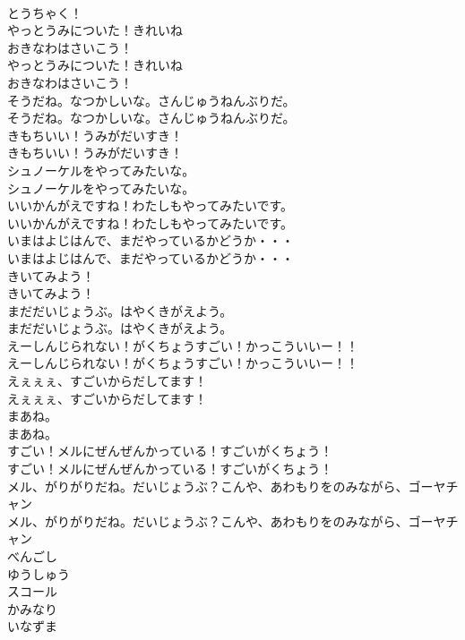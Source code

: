 \documentclass[8pt]{extreport}
\begin{document}
\begin{CJK}{UTF8}{min}
\\	とうちゃく！ 
\\	やっとうみについた！きれいね
\\	おきなわはさいこう！	
\\	やっとうみについた！きれいね
\\	おきなわはさいこう！ 
\\	そうだね。なつかしいな。さんじゅうねんぶりだ。	
\\	そうだね。なつかしいな。さんじゅうねんぶりだ。 
\\	きもちいい！うみがだいすき！	
\\	きもちいい！うみがだいすき！ 
\\	シュノーケルをやってみたいな。	
\\	シュノーケルをやってみたいな。 
\\	いいかんがえですね！わたしもやってみたいです。	
\\	いいかんがえですね！わたしもやってみたいです。 
\\	いまはよじはんで、まだやっているかどうか・・・	
\\	いまはよじはんで、まだやっているかどうか・・・ 
\\	きいてみよう！	
\\	きいてみよう！ 
\\	まだだいじょうぶ。はやくきがえよう。	
\\	まだだいじょうぶ。はやくきがえよう。 
\\	えーしんじられない！がくちょうすごい！かっこういいー！！	
\\	えーしんじられない！がくちょうすごい！かっこういいー！！ 
\\	えぇぇぇ、すごいからだしてます！	
\\	えぇぇぇ、すごいからだしてます！ 
\\	まあね。	
\\	まあね。 
\\	すごい！メルにぜんぜんかっている！すごいがくちょう！	
\\	すごい！メルにぜんぜんかっている！すごいがくちょう！ 
\\	メル、がりがりだね。だいじょうぶ？こんや、あわもりをのみながら、ゴーヤチャン	
\\	メル、がりがりだね。だいじょうぶ？こんや、あわもりをのみながら、ゴーヤチャン 
\\	べんごし
\\	ゆうしゅう
\\	スコール
\\	かみなり
\\	いなずま

\end{CJK}
\end{document}
